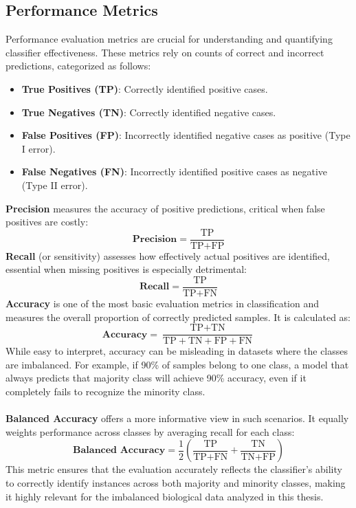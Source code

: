 \documentclass[12pt,a4paper]{report}
\begin{document}
\subsection{Performance Metrics}
Performance evaluation metrics are crucial for understanding and quantifying classifier effectiveness. These metrics rely on counts of correct and incorrect predictions, categorized as follows:
\begin{itemize}
\item \textbf{True Positives (TP)}: Correctly identified positive cases.
\item \textbf{True Negatives (TN)}: Correctly identified negative cases.
\item \textbf{False Positives (FP)}: Incorrectly identified negative cases as positive (Type I error).
\item \textbf{False Negatives (FN)}: Incorrectly identified positive cases as negative (Type II error).
\end{itemize}
\noindent
\textbf{Precision} measures the accuracy of positive predictions, critical when false positives are costly:
\[
\textbf{Precision} = \frac{\text{TP}}{\text{TP} + \text{FP}}
\]
\noindent
\textbf{Recall} (or sensitivity) assesses how effectively actual positives are identified, essential when missing positives is especially detrimental:
\[
\textbf{Recall} = \frac{\text{TP}}{\text{TP} + \text{FN}}
\]
\noindent
\textbf{Accuracy} is one of the most basic evaluation metrics in classification and measures the overall proportion of correctly predicted samples. It is calculated as:
\[
\textbf{Accuracy} = \frac{\text{TP} + \text{TN}}{\text{TP} + \text{TN} +  \text{FP} + \text{FN}}
\]
While easy to interpret, accuracy can be misleading in datasets where the classes are imbalanced. For example, if 90\% of samples belong to one class, a model that always predicts that majority class will achieve 90\% accuracy, even if it completely fails to recognize the minority class.\\
\\
\noindent
\textbf{Balanced Accuracy} offers a more informative view in such scenarios. It equally weights performance across classes by averaging recall for each class:
\[
\textbf{Balanced Accuracy} = \frac{1}{2} \left(\frac{\text{TP}}{\text{TP} + \text{FN}} + \frac{\text{TN}}{\text{TN} + \text{FP}}\right)
\]
This metric ensures that the evaluation accurately reflects the classifier’s ability to correctly identify instances across both majority and minority classes, making it highly relevant for the imbalanced biological data analyzed in this thesis.
\end{document}
